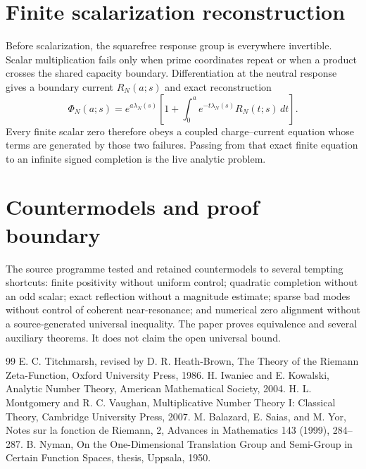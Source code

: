 \documentclass[11pt,a4paper]{article}
\begin{document}
\section{Finite scalarization reconstruction}
Before scalarization, the squarefree response group is everywhere invertible. Scalar multiplication fails only when prime coordinates repeat or when a product crosses the shared capacity boundary. Differentiation at the neutral response gives a boundary current $R_N(a;s)$ and exact reconstruction
\begin{equation}
\Phi_N(a;s)=e^{a\lambda_N(s)}
\left[1+\int_0^ae^{-t\lambda_N(s)}R_N(t;s)\,dt\right].
\end{equation}
Every finite scalar zero therefore obeys a coupled charge--current equation whose terms are generated by those two failures. Passing from that exact finite equation to an infinite signed completion is the live analytic problem.

\section{Countermodels and proof boundary}
The source programme tested and retained countermodels to several tempting shortcuts: finite positivity without uniform control; quadratic completion without an odd scalar; exact reflection without a magnitude estimate; sparse bad modes without control of coherent near-resonance; and numerical zero alignment without a source-generated universal inequality. The paper proves equivalence and several auxiliary theorems. It does not claim the open universal bound.

\begin{thebibliography}{99}
 E. C. Titchmarsh, revised by D. R. Heath-Brown, The Theory of the Riemann Zeta-Function, Oxford University Press, 1986.
 H. Iwaniec and E. Kowalski, Analytic Number Theory, American Mathematical Society, 2004.
 H. L. Montgomery and R. C. Vaughan, Multiplicative Number Theory I: Classical Theory, Cambridge University Press, 2007.
 M. Balazard, E. Saias, and M. Yor, Notes sur la fonction de Riemann, 2, Advances in Mathematics 143 (1999), 284--287.
 B. Nyman, On the One-Dimensional Translation Group and Semi-Group in Certain Function Spaces, thesis, Uppsala, 1950.
\end{thebibliography}
\end{document}
